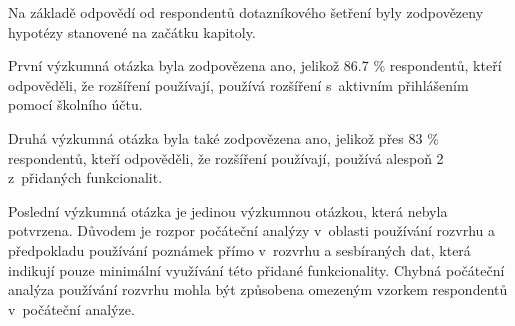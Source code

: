 Na základě odpovědí od respondentů dotazníkového šetření byly zodpovězeny hypotézy stanovené na začátku kapitoly.

První výzkumná otázka  byla zodpovězena ano, jelikož 86.7 \% respondentů, kteří odpověděli, že rozšíření používají, používá rozšíření s~aktivním přihlášením pomocí školního účtu.

Druhá výzkumná otázka  byla také zodpovězena ano, jelikož přes 83 \% respondentů, kteří odpověděli, že rozšíření používají, používá alespoň 2 z~přidaných funkcionalit.

Poslední výzkumná otázka  je jedinou výzkumnou otázkou, která nebyla potvrzena. Důvodem je rozpor počáteční analýzy v~oblasti používání rozvrhu a předpokladu používání poznámek přímo v~rozvrhu a sesbíraných dat, která indikují pouze minimální využívání této přidané funkcionality. Chybná počáteční analýza používání rozvrhu mohla být způsobena omezeným vzorkem respondentů v~počáteční analýze.
